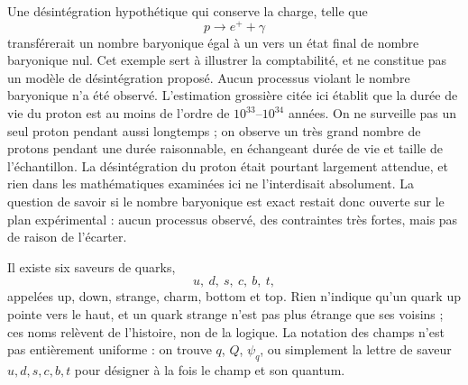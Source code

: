 Une désintégration hypothétique qui conserve la charge, telle que
\begin{equation}
p\longrightarrow e^++\gamma
\end{equation}
transférerait un nombre baryonique égal à un vers un état final de nombre baryonique nul. Cet exemple sert à illustrer la comptabilité, et ne constitue pas un modèle de désintégration proposé. Aucun processus violant le nombre baryonique n’a été observé. L’estimation grossière citée ici établit que la durée de vie du proton est au moins de l’ordre de \(10^{33}\)--\(10^{34}\) années. On ne surveille pas un seul proton pendant aussi longtemps ; on observe un très grand nombre de protons pendant une durée raisonnable, en échangeant durée de vie et taille de l’échantillon. La désintégration du proton était pourtant largement attendue, et rien dans les mathématiques examinées ici ne l’interdisait absolument. La question de savoir si le nombre baryonique est exact restait donc ouverte sur le plan expérimental : aucun processus observé, des contraintes très fortes, mais pas de raison de l’écarter.

\begin{classroomqa}
\end{classroomqa}

Il existe six saveurs de quarks,
\begin{equation}
u,\ d,\ s,\ c,\ b,\ t,
\end{equation}
appelées up, down, strange, charm, bottom et top. Rien n’indique qu’un quark up pointe vers le haut, et un quark strange n’est pas plus étrange que ses voisins ; ces noms relèvent de l’histoire, non de la logique. La notation des champs n’est pas entièrement uniforme : on trouve \(q\), \(Q\), \(\psi_q\), ou simplement la lettre de saveur \(u,d,s,c,b,t\) pour désigner à la fois le champ et son quantum.

\begin{classroomqa}
\end{classroomqa}

